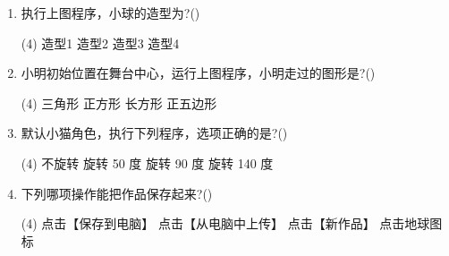 \documentclass[10pt, a4paper]{article}
\begin{document}
\begin{enumerate}
        \item 执行上图程序，小球的造型为?(\qquad)
        \begin{tasks}(4)
            \task 造型1
            \task 造型2
            \task 造型3
            \task 造型4
        \end{tasks}

        \item 小明初始位置在舞台中心，运行上图程序，小明走过的图形是?(\qquad)
        \begin{tasks}(4)
            \task 三角形
            \task 正方形
            \task 长方形
            \task 正五边形
        \end{tasks}

        \item 默认小猫角色，执行下列程序，选项正确的是?(\qquad)
        \begin{tasks}(4)
            \task 不旋转
            \task 旋转 50 度
            \task 旋转 90 度
            \task 旋转 140 度
        \end{tasks}

        \item 下列哪项操作能把作品保存起来?(\qquad)
        \begin{tasks}(4)
            \task 点击【保存到电脑】
            \task 点击【从电脑中上传】
            \task 点击【新作品】
            \task 点击地球图标
        \end{tasks}


\end{enumerate}
\end{document}
